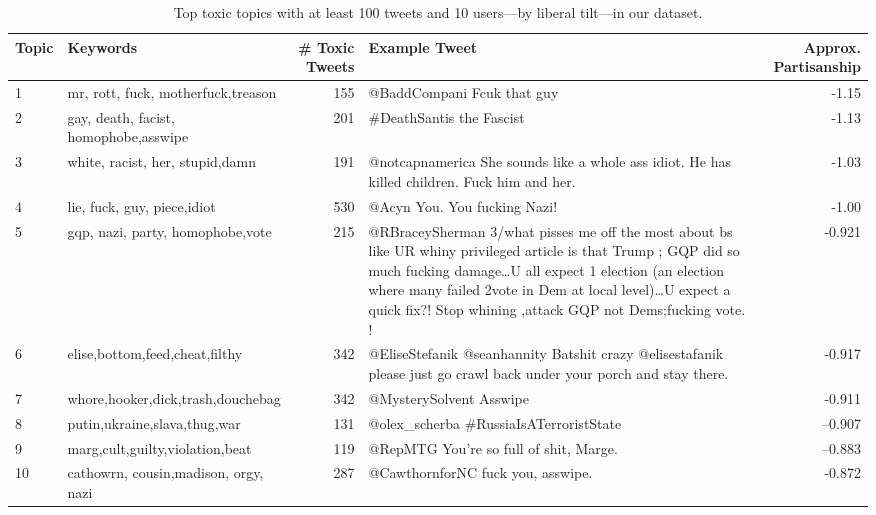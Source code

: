 \begin{table}
\centering
\scriptsize
\selectfont
\setlength{\tabcolsep}{4pt}
\begin{tabularx}{\textwidth}{l|lrXr}
\toprule
Topic &  {Keywords} & \# Toxic Tweets & Example Tweet  & Approx. Partisanship\\ \midrule
 1& mr, rott, fuck, motherfuck,treason & 155 &@BaddCompani Fcuk that guy  & -1.15\\
 2& gay, death, facist, homophobe,asswipe & 201 &$\#$DeathSantis the Fascist& -1.13 \\
  3& white, racist, her, stupid,damn & 191 &@notcapnamerica She sounds like a whole ass idiot. He has killed children. Fuck him and her.& -1.03 \\

  4 & lie, fuck, guy, piece,idiot & 530 &@Acyn You. You fucking Nazi!& -1.00\\

  5 & gqp, nazi, party, homophobe,vote & 215 &@RBraceySherman 3/what pisses me off the most about bs like UR whiny privileged article is that Trump ; GQP did so much fucking damage…U all expect 1 election (an election where many failed 2vote in Dem at local level)…U expect a quick fix?! Stop whining ,attack GQP not Dems;fucking vote. !& -0.921\\

  6 & elise,bottom,feed,cheat,filthy & 342 &@EliseStefanik @seanhannity Batshit crazy @elisestafanik please just go crawl back under your porch and stay there.& -0.917\\
   7 & whore,hooker,dick,trash,douchebag & 342 &  @MysterySolvent Asswipe& -0.911\\

   8 & putin,ukraine,slava,thug,war & 131 & @olex\_scherba $\#$RussiaIsATerroristState& --0.907\\

   9 & marg,cult,guilty,violation,beat & 119 & @RepMTG You're so full of shit, Marge.& --0.883\\

   10 & cathowrn, cousin,madison, orgy, nazi &287 & @CawthornforNC fuck you, asswipe.  & -0.872 \\
\bottomrule
\end{tabularx}
\caption{\label{tab:narratives} Top toxic topics  with at least 100 tweets and 10 users---by liberal tilt---in our dataset.} %
\end{table}



